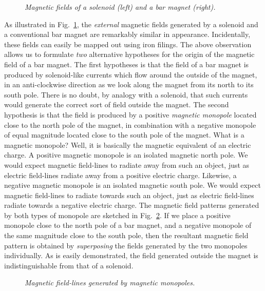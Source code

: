 \begin{figure}[h]
\epsfysize=2.5in
\centerline{}
\caption{\em Magnetic fields of a solenoid (left) and a bar magnet (right).}\label{f8.9}
\end{figure}

As illustrated in Fig.~\ref{f8.9}, the {\em external}\/ magnetic fields generated by
a solenoid and a conventional bar magnet are remarkably similar in
appearance. Incidentally,
these fields can easily be mapped out using iron filings. The above observation
allows us to formulate {\em two}\/ alternative hypotheses for the origin of the
magnetic field of a bar magnet. The first hypotheses is that the
field of a bar magnet is produced by solenoid-like currents which flow around the
outside of the magnet,  in an anti-clockwise direction as we look
along the magnet from its north to its south pole. There is no doubt, by analogy
with a solenoid, that such currents would generate the correct sort of field outside
the magnet. The second hypothesis is that the field is produced by a
positive {\em magnetic monopole}\/ located close to the north pole of the magnet, in combination with 
a  negative monopole of equal magnitude located close 
to the south pole of the magnet. What is a magnetic monopole? Well, it is basically
the magnetic equivalent of an electric charge. A positive magnetic monopole
is an isolated magnetic north pole. We would expect magnetic field-lines
to radiate away from such an object, just as electric field-lines radiate
away from a positive electric charge. Likewise, a negative magnetic monopole
is an isolated magnetic south pole. We would expect magnetic field-lines
to radiate towards such an object, just as electric field-lines radiate
towards a negative  electric charge. The magnetic field patterns generated by
both types of monopole are sketched in Fig.~\ref{f8.10}. If we place a positive monopole
close to the north pole of a bar magnet, and a negative monopole of the
same magnitude close to the
south pole, then the resultant magnetic field pattern 
is obtained by {\em superposing}\/
the fields generated by the two monopoles individually. 
As is easily  demonstrated, the field generated outside the magnet
is indistinguishable from that of a solenoid.

\begin{figure}[h]
\epsfysize=3in
\centerline{}
\caption{\em Magnetic field-lines generated by magnetic monopoles.}\label{f8.10}
\end{figure}

